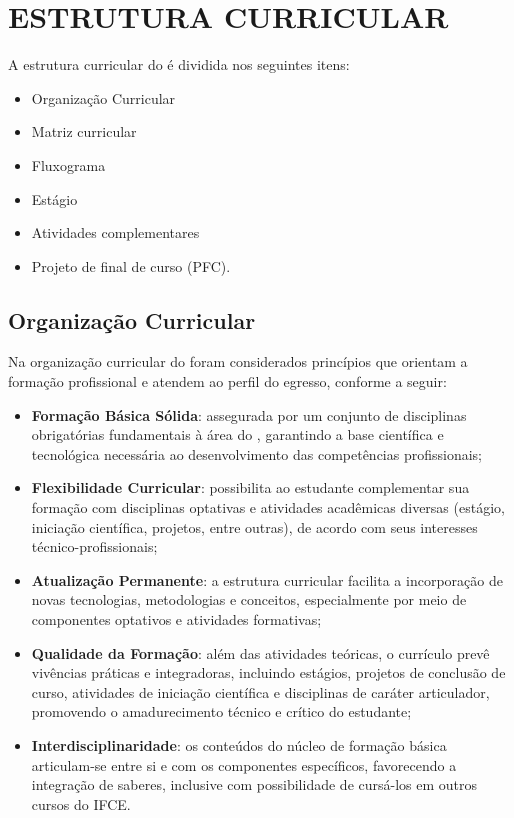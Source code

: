 \section{ESTRUTURA CURRICULAR}
A estrutura curricular do \NOMECURSO é dividida nos seguintes itens: 

\begin{itemize}
	\item Organização Curricular 
	\item Matriz curricular 
	\item Fluxograma
	\item Estágio
	\item Atividades complementares 
	\item Projeto de final de curso (PFC). 
\end{itemize}



\subsection{Organização Curricular}
Na organização curricular do \NOMECURSO foram considerados princípios que orientam a formação profissional e atendem ao perfil do egresso, conforme a seguir:

\begin{itemize}
	\item \textbf{Formação Básica Sólida}: assegurada por um conjunto de disciplinas obrigatórias fundamentais à área do \NOMECURSO, garantindo a base científica e tecnológica necessária ao desenvolvimento das competências profissionais;
	\item \textbf{Flexibilidade Curricular}: possibilita ao estudante complementar sua formação com disciplinas optativas e atividades acadêmicas diversas (estágio, iniciação científica, projetos, entre outras), de acordo com seus interesses técnico-profissionais;
	\item \textbf{Atualização Permanente}: a estrutura curricular facilita a incorporação de novas tecnologias, metodologias e conceitos, especialmente por meio de componentes optativos e atividades formativas;
	\item \textbf{Qualidade da Formação}: além das atividades teóricas, o currículo prevê vivências práticas e integradoras, incluindo estágios, projetos de conclusão de curso, atividades de iniciação científica e disciplinas de caráter articulador, promovendo o amadurecimento técnico e crítico do estudante;
	\item \textbf{Interdisciplinaridade}: os conteúdos do núcleo de formação básica articulam-se entre si e com os componentes específicos, favorecendo a integração de saberes, inclusive com possibilidade de cursá-los em outros cursos do IFCE.
\end{itemize}

